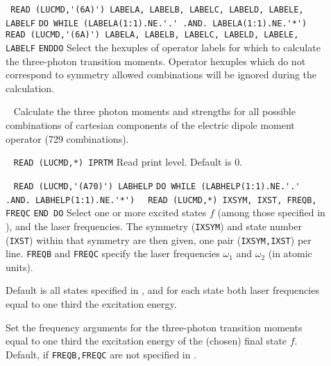 \begin{description}
\item[] \verb| |\newline
\verb|READ (LUCMD,'(6A)') LABELA, LABELB, LABELC, LABELD, LABELE, LABELF|\newline
\verb|DO WHILE (LABELA(1:1).NE.'.' .AND. LABELA(1:1).NE.'*')|\newline
\verb|   READ (LUCMD,'(6A)') LABELA, LABELB, LABELC, LABELD, LABELE, LABELF|\newline
\verb|ENDDO|\newline   
Select the hexuples of operator labels for which to calculate the three-photon transition
moments. Operator hexuples which do not correspond to symmetry allowed combinations will be
ignored during the calculation.
\item[] \verb| |\newline
Calculate the three photon moments and strengths for all possible combinations of cartesian 
components of the electric dipole moment operator (729 combinations).
\item[] \verb| |\newline
\verb|READ (LUCMD,*) IPRTM|\newline
Read print level. Default is 0.
\item[] \verb| | \newline
\verb|READ (LUCMD,'(A70)') LABHELP|\newline
\verb|DO WHILE (LABHELP(1:1).NE.'.' .AND. LABHELP(1:1).NE.'*')|\newline
\verb|  READ (LUCMD,*) IXSYM, IXST, FREQB, FREQC|\newline
\verb|END DO| \newline
Select one or more excited states $f$ (among those specified
in ), and the laser frequencies.
The symmetry (\verb+IXSYM+) and state number (\verb+IXST+)
within that symmetry are then given,
one pair (\verb|IXSYM,IXST|) per line.
\verb+FREQB+ and \verb+FREQC+ specify the 
laser frequencies $\omega_1$ and $\omega_2$ (in atomic units).


Default is all states specified in , and for each state
both laser frequencies equal to one third the excitation energy.

%
\item[]
Set the frequency arguments for the three-photon transition moments
equal to one third the excitation energy of the (chosen) 
final state $f$. Default, if \verb+FREQB,FREQC+ are not specified 
in .
%
\end{description}
